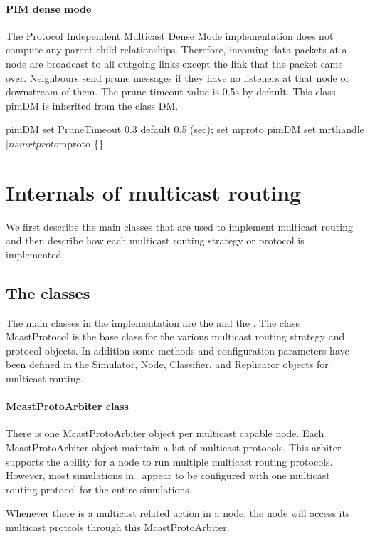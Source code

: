 \paragraph{PIM dense mode}
The Protocol Independent Multicast Dense Mode implementation
does not compute any parent-child relationships.
Therefore, incoming  data packets at a node are broadcast
to all outgoing links except the link that the packet came over.
Neighbours send prune messages if they have no listeners
at that node or downstream of them.
The prune timeout value is 0.5s by default.
This class pimDM is inherited from the class DM.
\begin{program}
        pimDM set PruneTimeout  0.3	\; default 0.5 (sec);
	set mproto pimDM
	set mrthandle [$ns mrtproto $mproto \{\}]
\end{program}

\section{Internals of multicast routing}
\label{sec:mcast-internals}

We first describe the main classes that are used to implement multicast
routing and then describe how each multicast routing strategy
or protocol is implemented.

\subsection{The classes}
The main classes in the implementation are
the  and
the .
The class McastProtocol is the base
class for the various multicast routing strategy and protocol objects.
In addition some methods and configuration parameters have been defined in
the Simulator, Node, Classifier, and Replicator objects for multicast
routing.

\paragraph{McastProtoArbiter class}
There is one McastProtoArbiter object per multicast capable node.
Each  McastProtoArbiter object maintain a list of multicast protocols.
This arbiter supports the ability for a node to run multiple multicast
routing protocols.
However, most simulations in \ns\ appear to be
configured with one multicast routing protocol for the entire simulations.

Whenever there is a multicast related action in a node, the
node will access its multicast protcols through this McastProtoArbiter.

